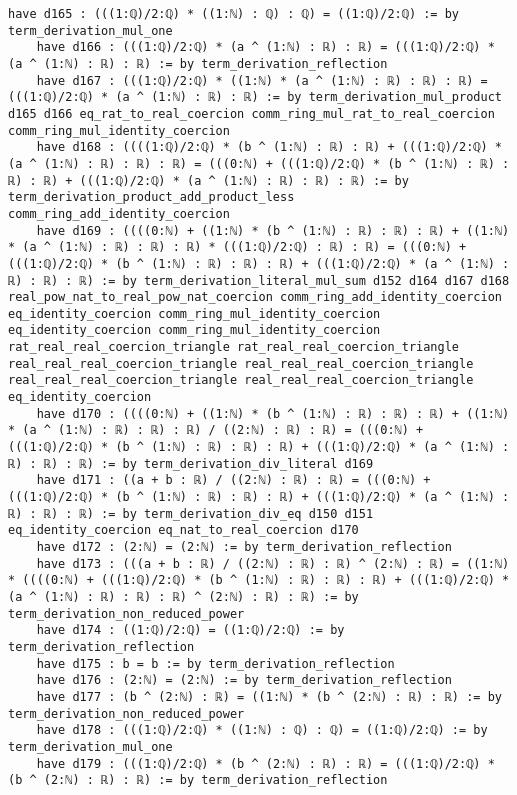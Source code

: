 \documentclass{article}
\begin{document}
\begin{tcolorbox}[colback=white!10, width=\linewidth]
\begin{lstlisting}[language=Lean4]
    have d165 : (((1:ℚ)/2:ℚ) * ((1:ℕ) : ℚ) : ℚ) = ((1:ℚ)/2:ℚ) := by term_derivation_mul_one
    have d166 : (((1:ℚ)/2:ℚ) * (a ^ (1:ℕ) : ℝ) : ℝ) = (((1:ℚ)/2:ℚ) * (a ^ (1:ℕ) : ℝ) : ℝ) := by term_derivation_reflection
    have d167 : (((1:ℚ)/2:ℚ) * ((1:ℕ) * (a ^ (1:ℕ) : ℝ) : ℝ) : ℝ) = (((1:ℚ)/2:ℚ) * (a ^ (1:ℕ) : ℝ) : ℝ) := by term_derivation_mul_product d165 d166 eq_rat_to_real_coercion comm_ring_mul_rat_to_real_coercion comm_ring_mul_identity_coercion
    have d168 : ((((1:ℚ)/2:ℚ) * (b ^ (1:ℕ) : ℝ) : ℝ) + (((1:ℚ)/2:ℚ) * (a ^ (1:ℕ) : ℝ) : ℝ) : ℝ) = (((0:ℕ) + (((1:ℚ)/2:ℚ) * (b ^ (1:ℕ) : ℝ) : ℝ) : ℝ) + (((1:ℚ)/2:ℚ) * (a ^ (1:ℕ) : ℝ) : ℝ) : ℝ) := by term_derivation_product_add_product_less comm_ring_add_identity_coercion
    have d169 : ((((0:ℕ) + ((1:ℕ) * (b ^ (1:ℕ) : ℝ) : ℝ) : ℝ) + ((1:ℕ) * (a ^ (1:ℕ) : ℝ) : ℝ) : ℝ) * (((1:ℚ)/2:ℚ) : ℝ) : ℝ) = (((0:ℕ) + (((1:ℚ)/2:ℚ) * (b ^ (1:ℕ) : ℝ) : ℝ) : ℝ) + (((1:ℚ)/2:ℚ) * (a ^ (1:ℕ) : ℝ) : ℝ) : ℝ) := by term_derivation_literal_mul_sum d152 d164 d167 d168 real_pow_nat_to_real_pow_nat_coercion comm_ring_add_identity_coercion eq_identity_coercion comm_ring_mul_identity_coercion eq_identity_coercion comm_ring_mul_identity_coercion rat_real_real_coercion_triangle rat_real_real_coercion_triangle real_real_real_coercion_triangle real_real_real_coercion_triangle real_real_real_coercion_triangle real_real_real_coercion_triangle eq_identity_coercion
    have d170 : ((((0:ℕ) + ((1:ℕ) * (b ^ (1:ℕ) : ℝ) : ℝ) : ℝ) + ((1:ℕ) * (a ^ (1:ℕ) : ℝ) : ℝ) : ℝ) / ((2:ℕ) : ℝ) : ℝ) = (((0:ℕ) + (((1:ℚ)/2:ℚ) * (b ^ (1:ℕ) : ℝ) : ℝ) : ℝ) + (((1:ℚ)/2:ℚ) * (a ^ (1:ℕ) : ℝ) : ℝ) : ℝ) := by term_derivation_div_literal d169
    have d171 : ((a + b : ℝ) / ((2:ℕ) : ℝ) : ℝ) = (((0:ℕ) + (((1:ℚ)/2:ℚ) * (b ^ (1:ℕ) : ℝ) : ℝ) : ℝ) + (((1:ℚ)/2:ℚ) * (a ^ (1:ℕ) : ℝ) : ℝ) : ℝ) := by term_derivation_div_eq d150 d151 eq_identity_coercion eq_nat_to_real_coercion d170
    have d172 : (2:ℕ) = (2:ℕ) := by term_derivation_reflection
    have d173 : (((a + b : ℝ) / ((2:ℕ) : ℝ) : ℝ) ^ (2:ℕ) : ℝ) = ((1:ℕ) * ((((0:ℕ) + (((1:ℚ)/2:ℚ) * (b ^ (1:ℕ) : ℝ) : ℝ) : ℝ) + (((1:ℚ)/2:ℚ) * (a ^ (1:ℕ) : ℝ) : ℝ) : ℝ) ^ (2:ℕ) : ℝ) : ℝ) := by term_derivation_non_reduced_power
    have d174 : ((1:ℚ)/2:ℚ) = ((1:ℚ)/2:ℚ) := by term_derivation_reflection
    have d175 : b = b := by term_derivation_reflection
    have d176 : (2:ℕ) = (2:ℕ) := by term_derivation_reflection
    have d177 : (b ^ (2:ℕ) : ℝ) = ((1:ℕ) * (b ^ (2:ℕ) : ℝ) : ℝ) := by term_derivation_non_reduced_power
    have d178 : (((1:ℚ)/2:ℚ) * ((1:ℕ) : ℚ) : ℚ) = ((1:ℚ)/2:ℚ) := by term_derivation_mul_one
    have d179 : (((1:ℚ)/2:ℚ) * (b ^ (2:ℕ) : ℝ) : ℝ) = (((1:ℚ)/2:ℚ) * (b ^ (2:ℕ) : ℝ) : ℝ) := by term_derivation_reflection

\end{lstlisting}
\end{tcolorbox}
\end{document}
